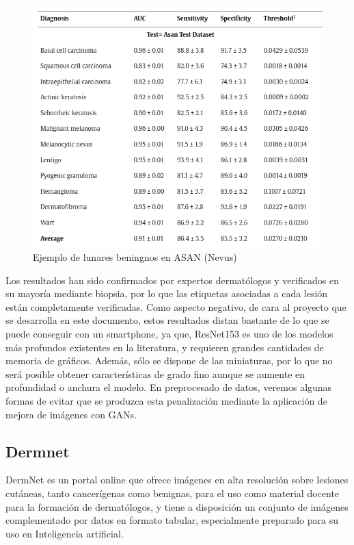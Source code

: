 \begin{figure}[H]
	\centering
	\includegraphics[scale = 0.4]{imagenes/results_asan.png}
	\caption{Ejemplo de lunares beningnos en ASAN (Nevus)}
\end{figure}

Los resultados han sido confirmados por expertos dermatólogos y verificados en su mayoría mediante biopsia, por lo que las etiquetas asociadas a cada lesión están completamente verificadas. Como aspecto negativo, de cara al proyecto que se desarrolla en este documento, estos resultados distan bastante de lo que se puede conseguir con un smartphone, ya que, ResNet153 es uno de los modelos más profundos existentes en la literatura, y requieren grandes cantidades de memoria de gráficos. Además, sólo se dispone de las miniaturas, por lo que no será posible obtener características de grado fino aunque se aumente en profundidad o anchura el modelo. En preprocesado de datos, veremos algunas formas de evitar que se produzca esta penalización mediante la aplicación de mejora de imágenes con GANs.

\subsection{Dermnet}

DermNet \cite{dermnetz} es un portal online que ofrece imágenes en alta resolución sobre lesiones cutáneas, tanto cancerígenas como benignas, para el uso como material docente para la formación de dermatólogos, y tiene a disposición un conjunto de imágenes complementado por datos en formato tabular, especialmente preparado para su uso en Inteligencia artificial.

